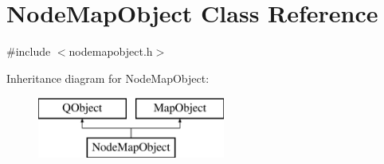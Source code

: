 \hypertarget{class_node_map_object}{}\section{Node\+Map\+Object Class Reference}
\label{class_node_map_object}


{\ttfamily \#include $<$nodemapobject.\+h$>$}

Inheritance diagram for Node\+Map\+Object\+:\begin{figure}[H]
\begin{center}
\leavevmode
\includegraphics[height=2.000000cm]{dc/da6/class_node_map_object}
\end{center}
\end{figure}
